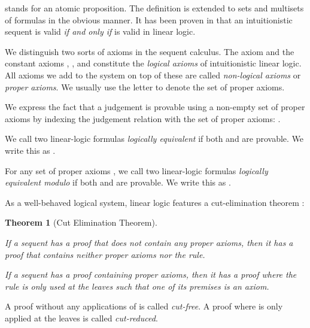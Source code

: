 \documentclass[acmtocl]{acmtrans2m}
\newtheorem{theorem}{Theorem}[section]
\begin{document}
 stands for an atomic proposition. The definition is extended to
sets and multisets of formulas in the obvious manner. It has been proven in
 that an intuitionistic sequent
 is valid \emph{if and only if}
 is valid in linear logic.

We distinguish two sorts of axioms in the sequent calculus. The 
axiom and the constant axioms , ,  and 
constitute the \emph{logical axioms} of intuitionistic linear logic. All axioms
we add to the system on top of these are called \emph{non-logical axioms} or
\emph{proper axioms}. We usually use the letter  to denote the set of
proper axioms.

We express the fact that a judgement  is provable using a
non-empty set  of proper axioms by indexing the judgement relation with
the set of proper axioms: .

\begin{definition}
	\label{def:ll-equiv}
\begin{longenum}
 \item We call two linear-logic formulas  \emph{logically
 equivalent} if both  and  are provable. We write
this as .
 \item For any set of proper axioms , we call two linear-logic formulas
  \emph{logically equivalent modulo } if both
  and  are provable. We
 write this as .
\end{longenum}
\end{definition}

As a well-behaved logical system, linear logic features a cut-elimination
theorem \cite{DBLP:journals/tcs/Girard87}:

\begin{theorem}[Cut Elimination Theorem]
\label{thm:cut-elim}
\begin{longenum}
  \item \label{prop:cut-free} If a sequent  has a proof 
  that does not contain any proper axioms, then it has a proof  that
  contains neither proper axioms nor the  rule.
  \item \label{prop:cut-red} If a sequent  has a proof
   containing proper axioms, then it has a proof  where the 
  rule is only used at the leaves such that one of its premises is an axiom.
\end{longenum}
\end{theorem}

A proof without any applications of  is called \emph{cut-free}. A proof where
 is only applied at the leaves is called \emph{cut-reduced}.
\end{document}
